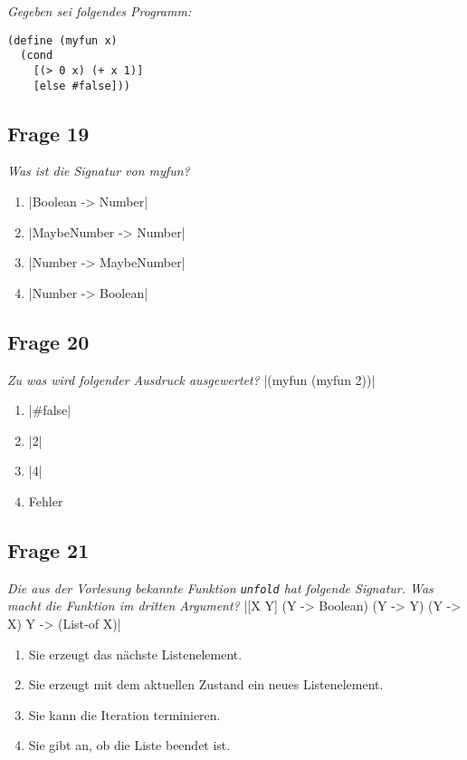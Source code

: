 \documentclass[a4paper, 11pt]{article}
\begin{document}
\begin{mdframed}
	\noindent\textit{Gegeben sei folgendes Programm:}
	\begin{verbatim}
(define (myfun x)
  (cond
    [(> 0 x) (+ x 1)]
    [else #false]))
\end{verbatim}

	\subsection*{Frage 19}
	\textit{Was ist die Signatur von myfun?}
	\begin{enumerate}[label=$\square$]
		\item {}|Boolean -> Number|
		\item {}|MaybeNumber -> Number|
		\item {}|Number -> MaybeNumber|
		\item {}|Number -> Boolean|
	\end{enumerate}

	\subsection*{Frage 20}
	\textit{Zu was wird folgender Ausdruck ausgewertet?}
	|(myfun (myfun 2))|
	\begin{enumerate}[label=$\square$]
		\item {}|#false|
		\item {}|2|
		\item {}|4|
		\item Fehler
	\end{enumerate}
\end{mdframed}

\subsection*{Frage 21}
\textit{Die aus der Vorlesung bekannte Funktion \texttt{unfold} hat folgende Signatur. Was macht die Funktion im dritten Argument?}
|[X Y] (Y -> Boolean) (Y -> Y) (Y -> X) Y -> (List-of X)|
\begin{enumerate}[label=$\square$]
	\item Sie erzeugt das nächste Listenelement.
	\item Sie erzeugt mit dem aktuellen Zustand ein neues Listenelement.
	\item Sie kann die Iteration terminieren.
	\item Sie gibt an, ob die Liste beendet ist.
\end{enumerate}
\end{document}
